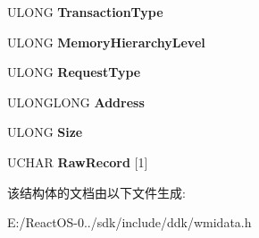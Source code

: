 \begin{DoxyCompactItemize}
U\+L\+O\+NG {\bfseries Transaction\+Type}
\item 
\mbox{\label{struct___m_s_m_c_a_event___memory_hierarchy_error_aa150c321328f8c672544a19bc63eb9fe}} 
U\+L\+O\+NG {\bfseries Memory\+Hierarchy\+Level}
\item 
\mbox{\label{struct___m_s_m_c_a_event___memory_hierarchy_error_a92e21fb74f1ff3221c97eddc51caffbd}} 
U\+L\+O\+NG {\bfseries Request\+Type}
\item 
\mbox{\label{struct___m_s_m_c_a_event___memory_hierarchy_error_a538fbb884519fcf76b26c3aa3a34ddd8}} 
U\+L\+O\+N\+G\+L\+O\+NG {\bfseries Address}
\item 
\mbox{\label{struct___m_s_m_c_a_event___memory_hierarchy_error_afc2d7b2e7354e80eb5b558c5b785c3a8}} 
U\+L\+O\+NG {\bfseries Size}
\item 
\mbox{\label{struct___m_s_m_c_a_event___memory_hierarchy_error_a7b32b6c595aa697a163353a9f6e486c0}} 
U\+C\+H\+AR {\bfseries Raw\+Record} \mbox{[}1\mbox{]}
\end{DoxyCompactItemize}


该结构体的文档由以下文件生成\+:\begin{DoxyCompactItemize}
\item 
E\+:/\+React\+O\+S-\/0../sdk/include/ddk/wmidata.\+h\end{DoxyCompactItemize}
